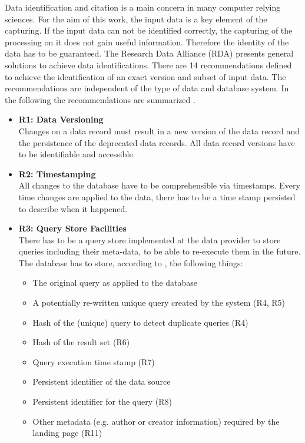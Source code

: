 \documentclass[draft,final]{vutinfth} %
\begin{document}
Data identification and citation is a main concern in many computer relying sciences. For the aim of this work, the input data is a key element of the capturing. If the input data can not be identified correctly, the capturing of the processing on it does not gain useful information. Therefore the identity of the data has to be guaranteed. The Research Data Alliance (RDA) presents general solutions to achieve data identifications. There are 14 recommendations defined to achieve the identification of an exact version and subset of input data. The recommendations are independent of the type of data and database system. In the following the recommendations are summarized \cite{rauber2016identification}.


\begin{itemize}
	\item \textbf{R1: Data Versioning} \\
	Changes on a data record must result in a new version of the data record and the persistence of the deprecated data records. All data record versions have to be identifiable and accessible. 
	\item \textbf{R2: Timestamping} \\
	All changes to the database have to be comprehensible via timestamps. Every time changes are applied to the data, there has to be a time stamp persisted to describe when it happened. 
	\item \textbf{R3: Query Store Facilities} \\
	There has to be a query store implemented at the data provider to store queries including their meta-data, to be able to re-execute them in the future. The database has to store, according to \cite{rauber2016identification}, the following things: 
	\begin{itemize}
		\item The original query as applied to the database
		\item A potentially re-written unique query created by the system (R4, R5)
		\item Hash of the (unique) query to detect duplicate queries (R4)
		\item Hash of the result set (R6)
		\item Query execution time stamp (R7)
		\item Persistent identifier of the data source
		\item Persistent identifier for the query (R8)
		\item Other metadata (e.g. author or creator information) required by the landing page (R11)

\end{itemize}
\end{itemize}
\end{document}
